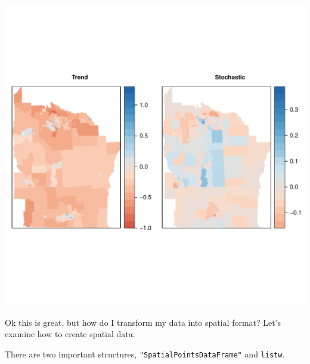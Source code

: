 \documentclass{article}\usepackage[]{graphicx}\usepackage[]{color}
\makeatletter
\def\maxwidth{ %
  \ifdim\Gin@nat@width>\linewidth
    \linewidth
  \else
    \Gin@nat@width
  \fi
}
\newenvironment{kframe}{%
 \def\at@end@of@kframe{}%
 \ifinner\ifhmode%
  \def\at@end@of@kframe{\end{minipage}}%
  \begin{minipage}{\columnwidth}%
 \fi\fi%
 \def\FrameCommand##1{\hskip\@totalleftmargin \hskip-\fboxsep
 \colorbox{shadecolor}{##1}\hskip-\fboxsep
     \hskip-\linewidth \hskip-\@totalleftmargin \hskip\columnwidth}%
 \MakeFramed {\advance\hsize-\width
   \@totalleftmargin\z@ \linewidth\hsize
   \@setminipage}}%
 {\par\unskip\endMakeFramed%
 \at@end@of@kframe}
\newenvironment{knitrout}{}{} %
\makeatother
\begin{document}
\begin{knitrout}
\begin{kframe}
\begin{alltt}
\end{alltt}
\end{kframe}
\includegraphics[width=\maxwidth]{figure/unnamed-chunk-18} 

\end{knitrout}

Ok this is great, but how do I transform my data into spatial format? Let's examine how to create spatial data.

There are two important structures,  \verb+"SpatialPointsDataFrame"+ and \verb+listw+.
\end{document}
